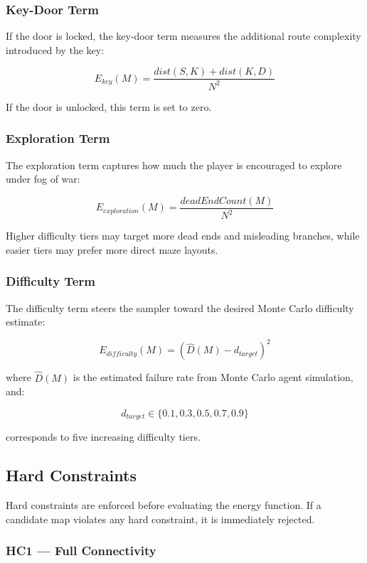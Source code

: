 \documentclass[11pt]{article}
\begin{document}
\subsubsection{Key-Door Term}

If the door is locked, the key-door term measures the additional route complexity introduced by the key:

\[
E_{key}(M) = \frac{dist(S,K) + dist(K,D)}{N^2}
\]

If the door is unlocked, this term is set to zero.

\subsubsection{Exploration Term}

The exploration term captures how much the player is encouraged to explore under fog of war:

\[
E_{exploration}(M) = \frac{deadEndCount(M)}{N^2}
\]

Higher difficulty tiers may target more dead ends and misleading branches, while easier tiers may prefer more direct maze layouts.

\subsubsection{Difficulty Term}

The difficulty term steers the sampler toward the desired Monte Carlo difficulty estimate:

\[
E_{difficulty}(M) =
(\hat{D}(M) - d_{target})^2
\]

where $\hat{D}(M)$ is the estimated failure rate from Monte Carlo agent simulation, and:

\[
d_{target} \in \{0.1, 0.3, 0.5, 0.7, 0.9\}
\]

corresponds to five increasing difficulty tiers.

\subsection{Hard Constraints}

Hard constraints are enforced before evaluating the energy function. If a candidate map violates any hard constraint, it is immediately rejected.

\subsubsection{HC1 --- Full Connectivity}
\end{document}
